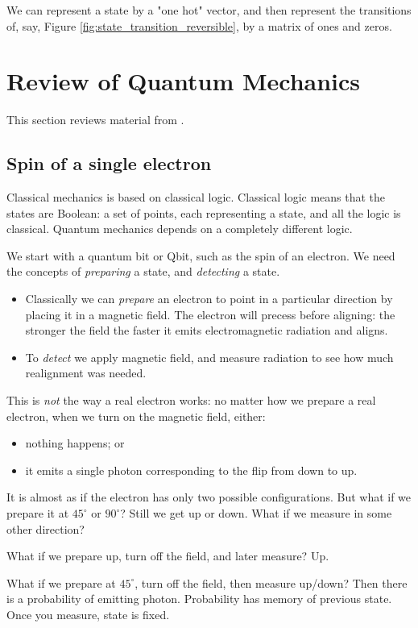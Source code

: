 \documentclass[]{article}
\begin{document}
We can represent a state by a "one hot" vector, and then represent the transitions of, say, Figure \ref{fig:state_transition_reversible}, by a matrix of ones and zeros.

\section{Review of Quantum Mechanics}

This section reviews material from \cite{susskind2013quantum}.
\subsection{Spin of a single electron}

Classical mechanics is based on classical logic. Classical logic means that the states are Boolean: a set of points, each representing a state, and all the logic is classical. Quantum mechanics depends on a completely different logic.

We start with a quantum bit or Qbit, such as the spin of an electron. We need the concepts of \emph{preparing} a state, and \emph{detecting} a state.

\begin{itemize}
	\item Classically we can \emph{prepare} an electron to point in a particular direction by placing it in a magnetic field. The electron will precess before aligning: the stronger the field the faster it emits electromagnetic radiation and aligns.
	\item To \emph{detect} we apply magnetic field, and measure radiation to see how much realignment was needed.
\end{itemize}

This is \emph{not} the way a real electron works: no matter how we prepare a real electron, when we turn on the magnetic field, either:
\begin{itemize}
	\item nothing happens; or
	\item it emits a single photon corresponding to the flip from down to up.
\end{itemize}
It is almost as if the electron has only two possible configurations. But what if we prepare it at $45^\circ$ or $90^\circ$? Still we get up or down. What if we measure in some other direction?

What if we prepare up, turn off the field, and later measure? Up.

What if we prepare at $45^\circ$, turn off the field, then measure up/down? Then there is a probability of emitting photon. Probability has memory of previous state. Once you measure, state is fixed.
\end{document}

